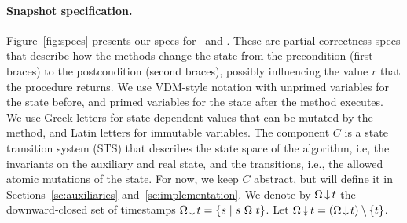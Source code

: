 %

\paragraph*{Snapshot specification.}
 
%
Figure~\ref{fig:specs} presents our specs for \jyscan~and
\jywrite. These are partial correctness specs that describe how
the methods change the state from the precondition (first braces) to
the postcondition (second braces), possibly influencing the value $r$
that the procedure returns. We use VDM-style notation with unprimed
variables for the state before, and primed variables for the state
after the method executes. We use Greek letters for state-dependent
values that can be mutated by the method, and Latin letters for
immutable variables.
%
The component $C$ is a state transition system (STS) that describes the
state space of the algorithm, i.e, the invariants on the auxiliary and
real state, and the transitions, i.e., the allowed atomic mutations of
the state. For now, we keep $C$ abstract, but will define it in
Sections~\ref{sc:auxiliaries} and~\ref{sc:implementation}.
%
We denote by $\Omega\,{\downarrow}\,t$ the downward-closed set of
timestamps
$\ideal{\stableorder}{t} = \{ s \mid s\ {\stableorder}\ t \}$. Let
$\sideal{\stableorder}{t} = (\ideal{\stableorder}{t})\setminus\{t\}$.

